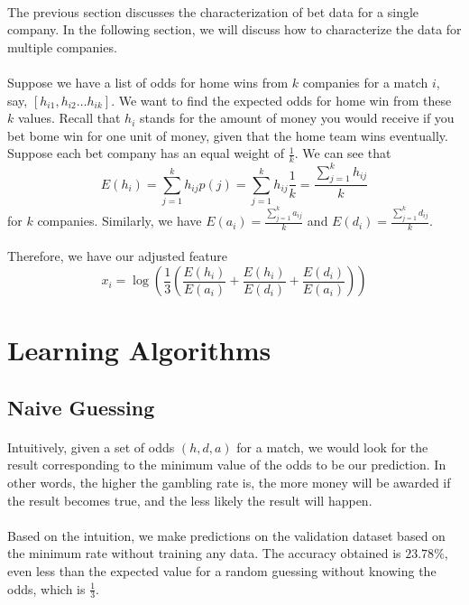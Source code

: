 \documentclass[12pt]{article}
\begin{document}
\paragraph{}
The previous section discusses the characterization of bet data for a single company. In the following section, we will discuss how to characterize the data for multiple companies.
\paragraph{}
Suppose we have a list of odds for home wins from $k$ companies for a match $i$, say, $[h_{i1}, h_{i2} \ldots h_{ik}]$. We want to find the expected odds for home win from these $k$ values. Recall that $h_i$ stands for the amount of money you would receive if you bet bome win for one unit of money, given that the home team wins eventually. Suppose each bet company has an equal weight of $\frac{1}{k}$. We can see that \[
E(h_i) = \sum_{j = 1}^{k}h_{ij}p(j) = \sum_{j = 1}^{k}h_{ij}\frac{1}{k} = \frac{\sum_{j = 1}^{k}h_{ij}}{k}
\]
for $k$ companies. Similarly, we have $
E(a_i) = \frac{\sum_{j = 1}^{k}a_{ij}}{k}$ and $ E(d_i) = \frac{\sum_{j = 1}^{k}d_{ij}}{k}$.
\paragraph{}
Therefore, we have our adjusted feature \[
x_i = \log(\frac{1}{3}(\frac{E(h_i)}{E(a_i)} + \frac{E(h_i)}{E(d_i)} + \frac{E(d_i)}{E(a_i)}))
\]
\section{Learning Algorithms}
\subsection{Naive Guessing}
\paragraph{}
Intuitively, given a set of odds $(h, d, a)$ for a match, we would look for the result corresponding to the minimum value of the odds to be our prediction. In other words, the higher the gambling rate is, the more money will be awarded if the result becomes true, and the less likely the result will happen.
\paragraph{}
Based on the intuition, we make predictions on the validation dataset based on the minimum rate without training any data. The accuracy obtained is $23.78 \%$, even less than the expected value for a random guessing without knowing the odds, which is $\frac{1}{3}$.
\end{document}
